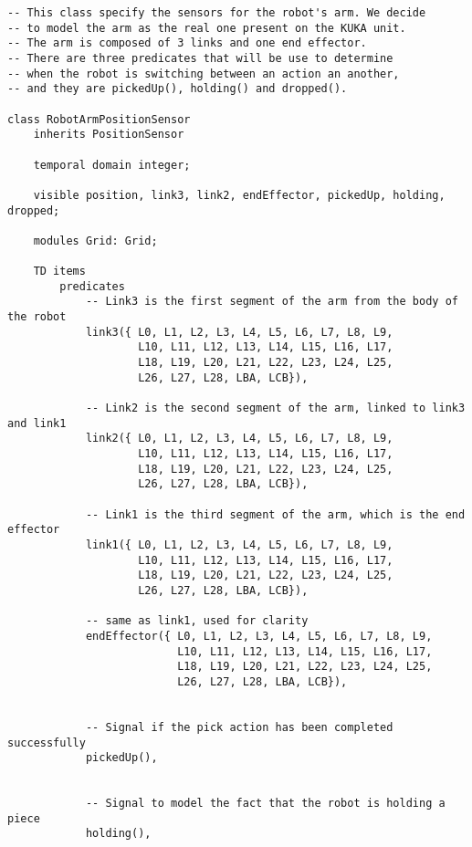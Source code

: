 \begin{lstlisting}[fontadjust, mathescape, frame=single] 
-- This class specify the sensors for the robot's arm. We decide
-- to model the arm as the real one present on the KUKA unit.
-- The arm is composed of 3 links and one end effector.
-- There are three predicates that will be use to determine
-- when the robot is switching between an action an another,
-- and they are pickedUp(), holding() and dropped().

class RobotArmPositionSensor
    inherits PositionSensor

    temporal domain integer;

    visible position, link3, link2, endEffector, pickedUp, holding, dropped;

    modules Grid: Grid;

    TD items
        predicates
            -- Link3 is the first segment of the arm from the body of the robot
            link3({ L0, L1, L2, L3, L4, L5, L6, L7, L8, L9,
                    L10, L11, L12, L13, L14, L15, L16, L17,
                    L18, L19, L20, L21, L22, L23, L24, L25,
                    L26, L27, L28, LBA, LCB}),
                    
            -- Link2 is the second segment of the arm, linked to link3 and link1
            link2({ L0, L1, L2, L3, L4, L5, L6, L7, L8, L9,
                    L10, L11, L12, L13, L14, L15, L16, L17,
                    L18, L19, L20, L21, L22, L23, L24, L25,
                    L26, L27, L28, LBA, LCB}),
                    
            -- Link1 is the third segment of the arm, which is the end effector 
            link1({ L0, L1, L2, L3, L4, L5, L6, L7, L8, L9,
                    L10, L11, L12, L13, L14, L15, L16, L17,
                    L18, L19, L20, L21, L22, L23, L24, L25,
                    L26, L27, L28, LBA, LCB}),
                     
            -- same as link1, used for clarity
            endEffector({ L0, L1, L2, L3, L4, L5, L6, L7, L8, L9,
                          L10, L11, L12, L13, L14, L15, L16, L17,
                          L18, L19, L20, L21, L22, L23, L24, L25,
                          L26, L27, L28, LBA, LCB}),
                    

            -- Signal if the pick action has been completed successfully
            pickedUp(),

            
            -- Signal to model the fact that the robot is holding a piece
            holding(),


\end{lstlisting}
